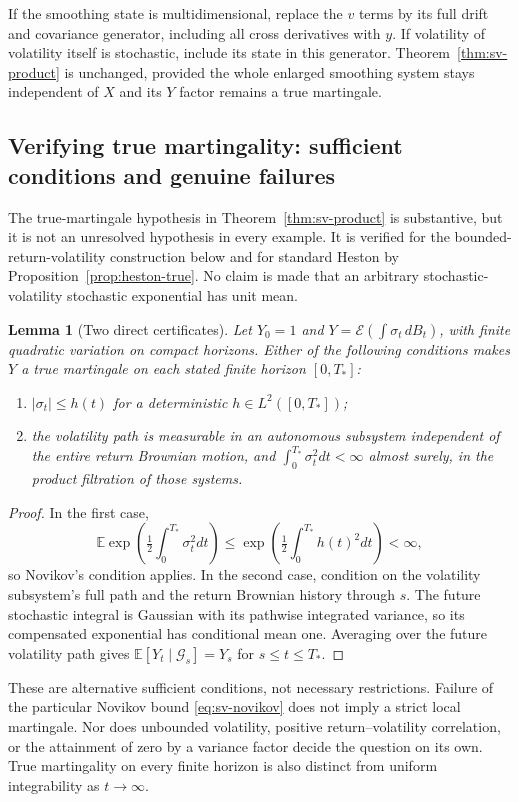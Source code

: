 \documentclass[11pt,a4paper]{article}
\numberwithin{equation}{section}
\newtheorem{lemma}[theorem]{Lemma}
\theoremstyle{definition}\newtheorem{definition}[theorem]{Definition}
\theoremstyle{remark}\newtheorem{remark}[theorem]{Remark}
\newcommand{\E}{\mathbb E}\newcommand{\R}{\mathbb R}
\begin{document}
If the smoothing state is multidimensional, replace the $v$ terms by its full drift and covariance generator, including all cross derivatives with $y$. If volatility of volatility itself is stochastic, include its state in this generator. Theorem~\ref{thm:sv-product} is unchanged, provided the whole enlarged smoothing system stays independent of $X$ and its $Y$ factor remains a true martingale.

\subsection{Verifying true martingality: sufficient conditions and genuine failures}
\label{sec:sv-certification}
The true-martingale hypothesis in Theorem~\ref{thm:sv-product} is substantive, but it is not an unresolved hypothesis in every example. It is verified for the bounded-return-volatility construction below and for standard Heston by Proposition~\ref{prop:heston-true}. No claim is made that an arbitrary stochastic-volatility stochastic exponential has unit mean.

\begin{lemma}[Two direct certificates]
\label{lem:sv-certificates}
Let $Y_0=1$ and $Y=\mathcal E(\int \sigma_t\,dB_t)$, with finite quadratic variation on compact horizons. Either of the following conditions makes $Y$ a true martingale on each stated finite horizon $[0,T_*]$:
\begin{enumerate}
\item $|\sigma_t|\leq h(t)$ for a deterministic $h\in L^2([0,T_*])$;
\item the volatility path is measurable in an autonomous subsystem independent of the entire return Brownian motion, and $\int_0^{T_*}\sigma_t^2dt<\infty$ almost surely, in the product filtration of those systems.
\end{enumerate}
\end{lemma}
\begin{proof}
In the first case,
\[
 \E\exp\left(\tfrac12\int_0^{T_*}\sigma_t^2dt\right)
 \leq \exp\left(\tfrac12\int_0^{T_*}h(t)^2dt\right)<\infty,
\]
so Novikov's condition applies. In the second case, condition on the volatility subsystem's full path and the return Brownian history through $s$. The future stochastic integral is Gaussian with its pathwise integrated variance, so its compensated exponential has conditional mean one. Averaging over the future volatility path gives $\E[Y_t\mid\mathcal G_s]=Y_s$ for $s\leq t\leq T_*$.
\end{proof}
These are alternative sufficient conditions, not necessary restrictions. Failure of the particular Novikov bound \eqref{eq:sv-novikov} does not imply a strict local martingale. Nor does unbounded volatility, positive return--volatility correlation, or the attainment of zero by a variance factor decide the question on its own. True martingality on every finite horizon is also distinct from uniform integrability as $t\to\infty$.
\end{document}
